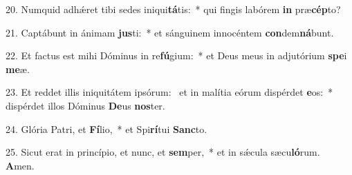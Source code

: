 20. Numquid adhǽret tibi sedes iniqui\textbf{tá}tis:~*  qui fingis labórem \textbf{in} præ\textbf{cép}to?\

21. Captábunt in ánimam \textbf{jus}ti:~*  et sánguinem innocéntem \textbf{con}dem\textbf{ná}bunt.\

22. Et factus est mihi Dóminus in re\textbf{fú}gium:~*  et Deus meus in adjutórium \textbf{spe}i \textbf{me}æ.\

23. Et reddet illis iniquitátem ipsórum: \dag\  et in malítia eórum dispérdet \textbf{e}os:~*  dispérdet illos Dóminus \textbf{De}us \textbf{nos}ter.\

24. Glória Patri, et \textbf{Fí}lio,~*  et Spi\textbf{rí}tui \textbf{Sanc}to.\

25. Sicut erat in princípio, et nunc, et \textbf{sem}per,~*  et in sǽcula sæcu\textbf{ló}rum. \textbf{A}men.\

